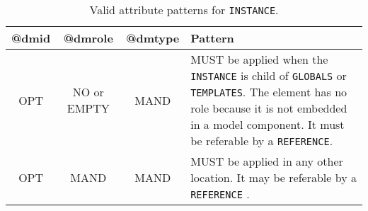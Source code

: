 \begin{table}[!htbp]
\small
\centering
\begin{tabulary}{\linewidth}{|c|c|c|J|}
    \hline 
        \textbf{@dmid} &
        \textbf{@dmrole} &
        \textbf{@dmtype} &
        \textbf{Pattern}\\
    \hline      \hline  
        OPT &           
        NO or EMPTY&           
        MAND &           
        MUST be applied when the  \texttt{INSTANCE} is child of \texttt{GLOBALS} or \texttt{TEMPLATES}. The element has no role because it is not embedded in a model component. It must be referable by a \texttt{REFERENCE}.  \\
    \hline   
        OPT &           
        MAND &           
        MAND &           
        MUST be applied in any other location. It may be referable by a \texttt{REFERENCE} . \\
   \hline 
\end{tabulary}
     \caption{Valid attribute patterns for  \texttt{INSTANCE}.} 
     \label{tbl:instance-pattern}
 \end{table}       
\newpage

 
